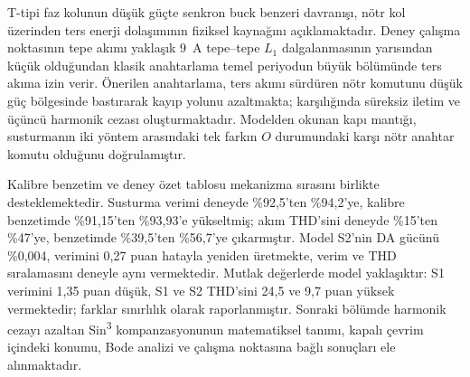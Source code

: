 T-tipi faz kolunun düşük güçte senkron buck benzeri davranışı, nötr kol üzerinden ters enerji dolaşımının fiziksel kaynağını açıklamaktadır. Deney çalışma noktasının tepe akımı yaklaşık \SI{9}{\ampere} tepe--tepe $L_1$ dalgalanmasının yarısından küçük olduğundan klasik anahtarlama temel periyodun büyük bölümünde ters akıma izin verir. Önerilen anahtarlama, ters akımı sürdüren nötr komutunu düşük güç bölgesinde bastırarak kayıp yolunu azaltmakta; karşılığında süreksiz iletim ve üçüncü harmonik cezası oluşturmaktadır. Modelden okunan kapı mantığı, susturmanın iki yöntem arasındaki tek farkın $O$ durumundaki karşı nötr anahtar komutu olduğunu doğrulamıştır.

Kalibre benzetim ve deney özet tablosu mekanizma sırasını birlikte desteklemektedir. Susturma verimi deneyde \%92,5'ten \%94,2'ye, kalibre benzetimde \%91,15'ten \%93,93'e yükseltmiş; akım THD'sini deneyde \%15'ten \%47'ye, benzetimde \%39,5'ten \%56,7'ye çıkarmıştır. Model S2'nin DA gücünü \%0,004, verimini 0,27 puan hatayla yeniden üretmekte, verim ve THD sıralamasını deneyle aynı vermektedir. Mutlak değerlerde model yaklaşıktır: S1 verimini 1,35 puan düşük, S1 ve S2 THD'sini 24,5 ve 9,7 puan yüksek vermektedir; farklar sınırlılık olarak raporlanmıştır. Sonraki bölümde harmonik cezayı azaltan Sin\textsuperscript{3} kompanzasyonunun matematiksel tanımı, kapalı çevrim içindeki konumu, Bode analizi ve çalışma noktasına bağlı sonuçları ele alınmaktadır.
